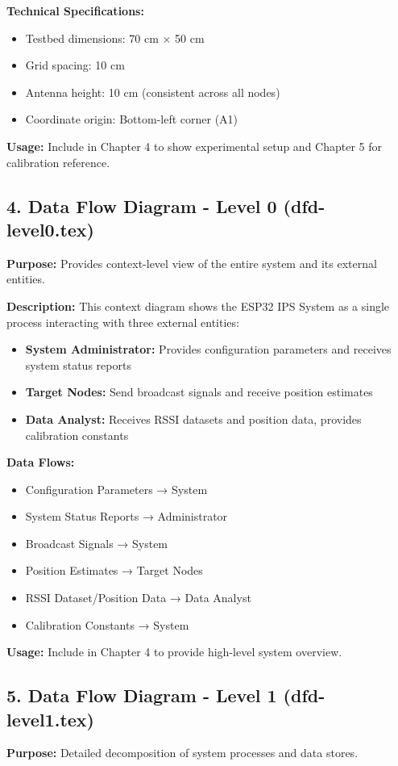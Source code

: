 \textbf{Technical Specifications:}
\begin{itemize}
    \item Testbed dimensions: 70 cm × 50 cm
    \item Grid spacing: 10 cm
    \item Antenna height: 10 cm (consistent across all nodes)
    \item Coordinate origin: Bottom-left corner (A1)
\end{itemize}

\textbf{Usage:} Include in Chapter 4 to show experimental setup and Chapter 5 for calibration reference.

\subsection*{4. Data Flow Diagram - Level 0 (dfd-level0.tex)}
\textbf{Purpose:} Provides context-level view of the entire system and its external entities.

\textbf{Description:}
This context diagram shows the ESP32 IPS System as a single process interacting with three external entities:
\begin{itemize}
    \item \textbf{System Administrator:} Provides configuration parameters and receives system status reports
    \item \textbf{Target Nodes:} Send broadcast signals and receive position estimates
    \item \textbf{Data Analyst:} Receives RSSI datasets and position data, provides calibration constants
\end{itemize}

\textbf{Data Flows:}
\begin{itemize}
    \item Configuration Parameters → System
    \item System Status Reports → Administrator
    \item Broadcast Signals → System
    \item Position Estimates → Target Nodes
    \item RSSI Dataset/Position Data → Data Analyst
    \item Calibration Constants → System
\end{itemize}

\textbf{Usage:} Include in Chapter 4 to provide high-level system overview.

\subsection*{5. Data Flow Diagram - Level 1 (dfd-level1.tex)}
\textbf{Purpose:} Detailed decomposition of system processes and data stores.

